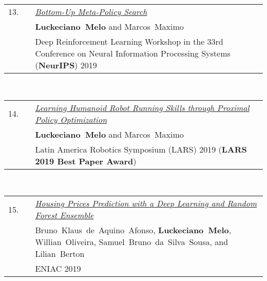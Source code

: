 \documentclass[11pt,letter,sans,colorlinks,linkcolor=true]{moderncv}
\begin{document}
\begin{minipage}{\textwidth}
\begin{tabular}{R{8mm}p{1mm}L{6.5in}}
 13.\hspace*{1mm} && \textit{\href{https://arxiv.org/abs/1910.10232}{Bottom-Up Meta-Policy Search} }  \\
 && \mbox{\textbf{Luckeciano Melo}} and \mbox{Marcos Maximo} \\
 && Deep Reinforcement Learning Workshop in the 33rd Conference on Neural Information Processing Systems (\textbf{NeurIPS}) 2019  \\
\end{tabular} \\[2mm]
\end{minipage}

\begin{minipage}{\textwidth}
\begin{tabular}{R{8mm}p{1mm}L{6.5in}}
 14.\hspace*{1mm} && \textit{\href{https://arxiv.org/abs/1910.10620}{Learning Humanoid Robot Running Skills through Proximal Policy Optimization} }  \\
 && \mbox{\textbf{Luckeciano Melo}} and \mbox{Marcos Maximo} \\
 && Latin America Robotics Symposium (LARS) 2019 (\textbf{LARS 2019 Best Paper Award}) \\
\end{tabular} \\[2mm]
\end{minipage}

\begin{minipage}{\textwidth}
\begin{tabular}{R{8mm}p{1mm}L{6.5in}}
 15.\hspace*{1mm} && \textit{\href{https://api.semanticscholar.org/CorpusID:214699727}{Housing Prices Prediction with a Deep Learning and Random Forest Ensemble} }  \\
 && \mbox{Bruno Klaus de Aquino Afonso}, \mbox{\textbf{Luckeciano Melo}}, \mbox{Willian Oliveira}, \mbox{Samuel Bruno da Silva Sousa}, and \mbox{Lilian Berton} \\
 && ENIAC 2019  \\
\end{tabular} \\[2mm]
\end{minipage}
\end{document}
